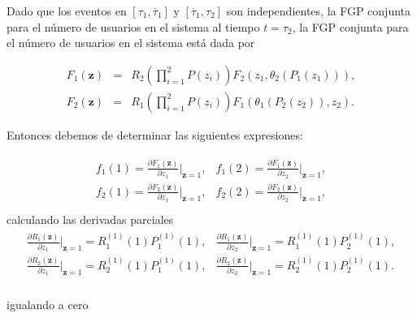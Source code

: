 \documentclass{article}
\numberwithin{equation}{section}
\begin{document}
Dado que los eventos en
$\left[\tau_{1},\overline{\tau}_{1}\right]$ y $\left[\overline{\tau}_{1},\tau_{2}\right]$ son independientes, la FGP conjunta para el n\'umero de usuarios en el sistema al tiempo $t=\tau_{2}$, la FGP conjunta para el n\'umero de usuarios en el sistema est\'a dada por

\begin{eqnarray*}
F_{1}\left(\mathbf{z}\right)&=&R_{2}\left(\prod_{i=1}^{2}P\left(z_{i}\right)\right)F_{2}\left(z_{1},\theta_{2}\left(P_{1}\left(z_{1}\right)\right)\right),\\
F_{2}\left(\mathbf{z}\right)&=&R_{1}\left(\prod_{i=1}^{2}P\left(z_{i}\right)\right)F_{1}\left(\theta_{1}\left(P_{2}\left(z_{2}\right)\right),z_{2}\right).
\end{eqnarray*}

Entonces debemos de determinar las siguientes expresiones:

\begin{eqnarray*}
\begin{array}{cc}
f_{1}\left(1\right)=\frac{\partial F_{1}\left(\mathbf{z}\right)}{\partial z_{1}}|_{\mathbf{z}=1}, & f_{1}\left(2\right)=\frac{\partial F_{1}\left(\mathbf{z}\right)}{\partial z_{2}}|_{\mathbf{z}=1},\\
f_{2}\left(1\right)=\frac{\partial F_{2}\left(\mathbf{z}\right)}{\partial z_{1}}|_{\mathbf{z}=1}, & f_{2}\left(2\right)=\frac{\partial F_{2}\left(\mathbf{z}\right)}{\partial z_{2}}|_{\mathbf{z}=1},\\
\end{array}
\end{eqnarray*}
calculando las derivadas parciales 
\begin{eqnarray*}
\begin{array}{ll}
\frac{\partial R_{1}\left(\mathbf{z}\right)}{\partial
z_{1}}|_{\mathbf{z}=1}=R_{1}^{(1)}\left(1\right)P_{1}^{(1)}\left(1\right),&
\frac{\partial R_{1}\left(\mathbf{z}\right)}{\partial
z_{2}}|_{\mathbf{z}=1}=R_{1}^{(1)}\left(1\right)P_{2}^{(1)}\left(1\right),\\
\frac{\partial R_{2}\left(\mathbf{z}\right)}{\partial
z_{1}}|_{\mathbf{z}=1}=R_{2}^{(1)}\left(1\right)P_{1}^{(1)}\left(1\right),&
\frac{\partial R_{2}\left(\mathbf{z}\right)}{\partial
z_{2}}|_{\mathbf{z}=1}=R_{2}^{(1)}\left(1\right)P_{2}^{(1)}\left(1\right).\\
\end{array}
\end{eqnarray*}

igualando a cero
\end{document}
